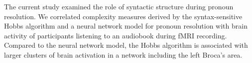 The current study examined the role of syntactic structure during pronoun resolution. We correlated complexity measures derived by the syntax-sensitive Hobbs algorithm and a neural network model for pronoun resolution with brain activity of participants listening to an audiobook during fMRI recording. Compared to the neural network model, the Hobbs algorithm is associated with larger clusters of brain activation in a network including the left Broca's area.
